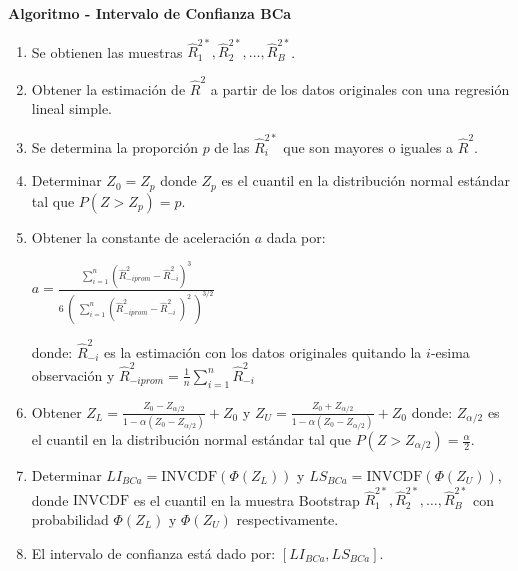 \textbf{Algoritmo - Intervalo de Confianza BCa}

\begin{enumerate}
	
	\item Se obtienen las muestras $\hat{R}^{2*}_{1} , \hat{R}^{2*}_{2}, \dots,\hat{R}^{2*}_{B}$.
	
	\item Obtener la estimación de $\hat{R}^{2}$ a partir de los datos originales con una regresión lineal simple.
	
	\item Se determina la proporción $p$ de las  $\hat{R}^{2*}_{i}$ que son mayores o iguales a $\hat{R}^{2}$.
	
	\item  Determinar $Z_{0} = Z_{p}$ donde $Z_{p}$ es el cuantil en la distribución normal estándar tal que $P(Z > Z_{p}) = p$.
	
	\item  Obtener la constante de aceleración $a$ dada por:
	\begin{center}
		\Large $ a = \frac{\sum_{i=1}^{n}  (\hat{R}^{2}_{-iprom}  - \hat{R}^{2}_{-i})^{3} }{ 6 \; (\; \sum_{i=1}^{n}  ( \hat{R}^{2}_{-iprom}  - \hat{R}^{2}_{-i} \;)^{2} \; )^{3/2}} $
	\end{center}
	
	donde: $\hat{R}^{2}_{-i}$ es la estimación con los datos originales quitando la $i$-esima observación y {\normalsize $\hat{R}^{2}_{-iprom} = \frac{1}{n} \sum_{i=1}^{n}\hat{R}^{2}_{-i}$}
	
	\item Obtener {\large $Z_{L} = \frac{Z_{0} - Z_{\alpha/2}}{ 1- \alpha ( Z_{0} - Z_{\alpha/2})} + Z_{0}  $}   y {\large $Z_{U} = \frac{Z_{0} + Z_{\alpha/2}}{ 1- \alpha ( Z_{0} - Z_{\alpha/2})} + Z_{0}  $}  donde: $Z_{\alpha /2}$ es el cuantil en la
	distribución normal estándar tal que $P(Z > Z_{\alpha / 2}) = \frac{\alpha}{2}$.
	
	\item Determinar \( LI_{BCa} = \text{INVCDF}(\Phi(Z_{L})) \) y \( LS_{BCa} = \text{INVCDF}(\Phi(Z_{U})) \), donde \( \text{INVCDF} \) es el cuantil en la muestra Bootstrap \( \hat{R}^{2*}_{1}, \hat{R}^{2*}_{2}, \dots, \hat{R}^{2*}_{B} \) con probabilidad \( \Phi(Z_{L}) \) y \( \Phi(Z_{U}) \) respectivamente.
	
	\item El intervalo de confianza está dado por: \( [LI_{BCa}, LS_{BCa}] \).

\end{enumerate}




